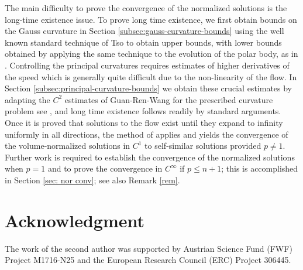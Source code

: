 \documentclass{amsart}
\newtheorem{theorem}{Theorem}
\theoremstyle{definition}
\theoremstyle{remark}
\newtheorem{remark}[theorem]{Remark}
\numberwithin{equation}{section}
\begin{document}
The main difficulty to prove the convergence of the normalized solutions is the long-time existence issue. To prove long time existence, we first obtain bounds on the Gauss curvature in Section \ref{subsec:gauss-curvature-bounds} using the well known standard technique of Tso \cite{Tso} to obtain upper bounds, with lower bounds obtained by applying the same technique to the evolution of the polar body, as in \cite{Ivaki-Proc}.  Controlling the principal curvatures requires estimates of higher derivatives of the speed which is generally quite difficult due to the non-linearity of the flow. In Section \ref{subsec:principal-curvature-bounds} we obtain these crucial estimates by adapting the $C^2$ estimates of Guan-Ren-Wang for the prescribed curvature problem see \cite[(4.2)]{Guan}, and long time existence follows readily by standard arguments. Once it is proved that solutions to the flow exist until they expand to infinity uniformly in all directions, the method of \cite[Section 8]{Ivaki 2014-gauss} applies and yields the convergence of the volume-normalized solutions in $C^{1}$ to self-similar solutions provided $p\neq1$. Further work is required to establish the convergence of the normalized solutions when $p=1$ and to prove the convergence in $C^{\infty}$ if $p\leq n+1$; this is accomplished in Section \ref{sec: nor conv}; see also Remark \ref{rem}.
\section*{Acknowledgment}
The work of the second author was supported by Austrian Science Fund (FWF) Project
M1716-N25 and the European
Research Council (ERC) Project 306445.


\end{document}
